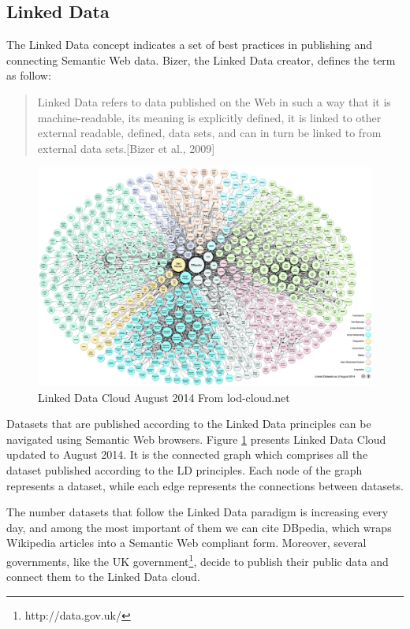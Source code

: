 \subsection{Linked Data}\label{sec:ldata}

The Linked Data concept indicates a set of best practices in publishing and connecting Semantic Web data. Bizer, the Linked Data creator, defines the term as follow:

\begin{quote}
Linked Data refers to data published on the Web in such a way that it is machine-readable, its meaning is explicitly defined, it is linked to other external readable, defined, data sets, and can in turn be linked to from external data sets.[Bizer et al., 2009]
\end{quote} 

\begin{figure}[tbh]
  \centering
	\includegraphics[width=\linewidth]{images/lod}
	\caption{Linked Data Cloud August 2014 From lod-cloud.net} 
  	\label{fig:lod}
\end{figure}

Datasets that are published according to the Linked Data principles can be navigated using Semantic Web browsers. Figure \ref{fig:lod} presents  Linked Data Cloud updated to August 2014. It is the connected graph which comprises all the dataset published according to the LD principles. Each node of the graph represents a dataset, while each edge represents the connections between datasets.

The number datasets that follow the Linked Data paradigm is increasing every day, and among the most important of them we can cite DBpedia, which wraps Wikipedia articles into a Semantic Web compliant form. Moreover, several governments, like the UK government\footnote{http://data.gov.uk/}, decide to publish their public data and connect them to the Linked Data cloud. 

